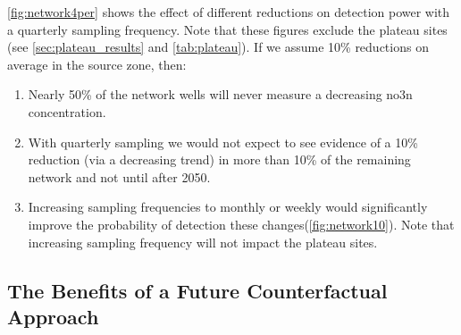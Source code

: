 \autoref{fig:network4per} shows the effect of different reductions on detection power with a quarterly sampling frequency.
Note that these figures exclude the plateau sites (see \autoref{sec:plateau_results} and \autoref{tab:plateau}).
If we assume 10\% reductions on average in the source zone, then:
\begin{enumerate}
    \item Nearly 50\% of the network wells will never measure a decreasing \gls{no3n} concentration.
    \item With quarterly sampling we would not expect to see evidence of a 10\% reduction (via a decreasing trend) in more than 10\% of the remaining network and not until after 2050.
    \item Increasing sampling frequencies to monthly or weekly would significantly improve the probability of detection these changes(\autoref{fig:network10}). Note that increasing sampling frequency will not impact the plateau sites.
\end{enumerate}

\begin{landscape}




\end{landscape}

\subsection[Counterfactual Approach]{The Benefits of a Future Counterfactual Approach} \label{sec:counterfactual}

